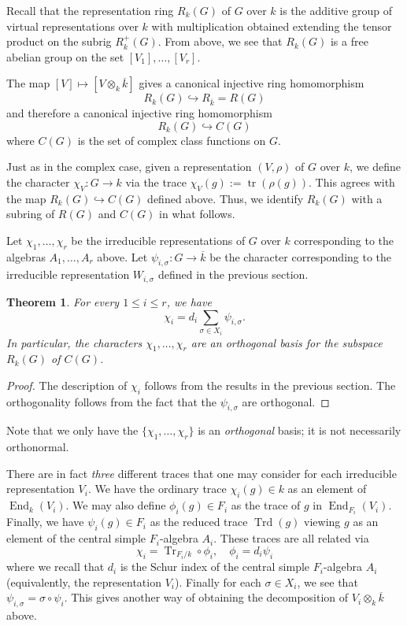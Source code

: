 \documentclass[12pt]{article}
\theoremstyle{plain}
\newtheorem{theorem}{Theorem}[section]
\theoremstyle{definition}
\theoremstyle{remark}
\numberwithin{equation}{section}
\begin{document}
Recall that the representation ring $R_k(G)$ of $G$ over $k$
is the additive group of virtual representations over $k$
with multiplication obtained extending the tensor product
on the subrig $R_k^+(G)$.
From above, we see that $R_k(G)$ is a free abelian group
on the set $[V_1],\ldots,[V_r]$.

The map $[V] \mapsto [V \otimes_k \overline{k}]$
gives a canonical injective ring homomorphism
\[
R_k(G) \hookrightarrow R_{\overline{k}} = R(G)
\]
and therefore a canonical injective ring homomorphism
\[
R_k(G) \hookrightarrow C(G)
\]
where $C(G)$ is the set of complex class functions on $G$.

Just as in the complex case, given a representation $(V,\rho)$
of $G$ over $k$, we define the character
$\chi_V : G \to k$
via the trace $\chi_V(g) := \operatorname{tr}(\rho(g))$.
This agrees with the map $R_k(G) \hookrightarrow C(G)$ defined above.
Thus, we identify $R_k(G)$ with a subring of $R(G)$ and $C(G)$ in what
follows.

Let $\chi_1,\ldots,\chi_r$ be the irreducible representations of $G$
over $k$ corresponding to the algebras $A_1,\ldots, A_r$ above.
Let $\psi_{i,\sigma} : G \to \overline{k}$ be the character
corresponding to the irreducible representation $W_{i,\sigma}$
defined in the previous section.

\begin{theorem}
For every $1 \le i \le r$, we have
\[
\chi_i = d_i \sum_{\sigma \in X_i} \psi_{i,\sigma} .
\]
In particular, the characters $\chi_1,\ldots, \chi_r$
are an orthogonal basis for the subspace $R_k(G)$ of $C(G)$.
\end{theorem}

\begin{proof}
The description of $\chi_i$ follows from the results in the previous
section.
The orthogonality follows from the fact that the $\psi_{i,\sigma}$
are orthogonal.
\end{proof}

Note that we only have the $\{\chi_1,\ldots,\chi_r\}$ is an
\emph{orthogonal} basis; it is not necessarily orthonormal.

There are in fact \emph{three} different traces that one may consider
for each irreducible representation $V_i$.
We have the ordinary trace $\chi_i(g) \in k$ as an element of
$\operatorname{End}_k(V_i)$.
We may also define $\phi_i(g) \in F_i$ as the trace of $g$ in
$\operatorname{End}_{F_i}(V_i)$.
Finally, we have $\psi_i(g) \in F_i$ as the reduced trace
$\operatorname{Trd}(g)$ viewing $g$ as an element of the central simple
$F_i$-algebra $A_i$.
These traces are all related via
\[
\chi_i = \operatorname{Tr}_{F_i/k} \circ \phi_i, \quad
\phi_i = d_i \psi_i
\]
where we recall that $d_i$ is the Schur index of the central simple
$F_i$-algebra $A_i$ (equivalently, the representation $V_i$).
Finally for each $\sigma \in X_i$, we see that $\psi_{i,\sigma} = \sigma
\circ \psi_i$.
This gives another way of obtaining the decomposition of $V_i \otimes_k
\overline{k}$ above.
\end{document}
